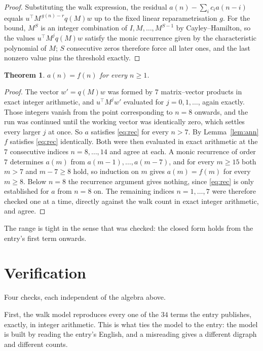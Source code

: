 \documentclass[11pt,a4paper]{article}
\theoremstyle{plain}
\newtheorem{theorem}{Theorem}
\theoremstyle{definition}
\begin{document}
\begin{proof}
Substituting the walk expression, the residual $a(n)-\sum_ic_ia(n-i)$ equals
$u^{\!\top}M^{\,g(n)-r}q(M)w$ up to the fixed linear reparametrisation $g$. For the bound,
$M^{S}$ is an integer combination of $I,M,\dots,M^{S-1}$ by Cayley--Hamilton, so the values
$u^{\!\top}M^{j}q(M)w$ satisfy the monic recurrence given by the characteristic polynomial of
$M$; $S$ consecutive zeros therefore force all later ones, and the last nonzero value pins the
threshold exactly.
\end{proof}

\begin{theorem}
$a(n)=f(n)$ for every $n\ge1$.
\end{theorem}

\begin{proof}
The vector $w'=q(M)w$ was formed by $7$ matrix--vector products in exact integer
arithmetic, and $u^{\!\top}M^{j}w'$ evaluated for $j=0,1,\dots$, again exactly. Those integers
vanish from the point corresponding to $n=8$ onwards, and the run was continued until the
working vector was identically zero, which settles every larger $j$ at once. So $a$ satisfies
\eqref{eq:rec} for every $n>7$. By Lemma~\ref{lem:ann} $f$ satisfies \eqref{eq:rec}
identically. Both were then evaluated in exact arithmetic at the $7$ consecutive indices
$n=8,\dots,14$ and agree at each. A monic recurrence of order $7$
determines $a(m)$ from $a(m-1),\dots,a(m-7)$, and for every $m\ge15$ both
$m>7$ and $m-7\ge8$ hold, so induction on $m$ gives $a(m)=f(m)$ for every
$m\ge8$.
Below $n=8$ the recurrence argument gives nothing, since \eqref{eq:rec} is only
established for $a$ from $n=8$ on. The remaining indices $n=1,\dots,7$ were
therefore checked one at a time, directly against the walk count in exact integer arithmetic,
and agree.
\end{proof}

The range is tight in the sense that was checked: the closed form holds from the entry's first term onwards.

\section{Verification}

Four checks, each independent of the algebra above.

First, the walk model reproduces every one of the $34$ terms the entry publishes,
exactly, in integer arithmetic. This is what ties the model to the entry: the model is built
by reading the entry's English, and a misreading gives a different digraph and different
counts.
\end{document}
